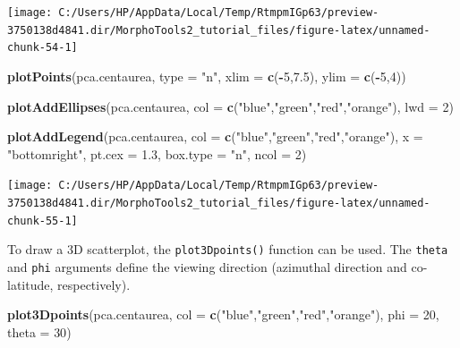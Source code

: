 \documentclass[
]{article}
\newenvironment{Shaded}{\begin{snugshade}}{\end{snugshade}}
\newcommand{\DataTypeTok}[1]{\textcolor[rgb]{0.13,0.29,0.53}{#1}}
\newcommand{\DecValTok}[1]{\textcolor[rgb]{0.00,0.00,0.81}{#1}}
\newcommand{\FloatTok}[1]{\textcolor[rgb]{0.00,0.00,0.81}{#1}}
\newcommand{\KeywordTok}[1]{\textcolor[rgb]{0.13,0.29,0.53}{\textbf{#1}}}
\newcommand{\NormalTok}[1]{#1}
\newcommand{\OperatorTok}[1]{\textcolor[rgb]{0.81,0.36,0.00}{\textbf{#1}}}
\newcommand{\StringTok}[1]{\textcolor[rgb]{0.31,0.60,0.02}{#1}}
\begin{document}
\begin{center}\texttt{[image: C:/Users/HP/AppData/Local/Temp/RtmpmIGp63/preview-3750138d4841.dir/MorphoTools2\_tutorial\_files/figure-latex/unnamed-chunk-54-1]} \end{center}

\begin{Shaded}
\begin{Highlighting}[]
\KeywordTok{plotPoints}\NormalTok{(pca.centaurea, }\DataTypeTok{type =} \StringTok{"n"}\NormalTok{, }\DataTypeTok{xlim =} \KeywordTok{c}\NormalTok{(}\OperatorTok{-}\DecValTok{5}\NormalTok{,}\FloatTok{7.5}\NormalTok{), }\DataTypeTok{ylim =} \KeywordTok{c}\NormalTok{(}\OperatorTok{-}\DecValTok{5}\NormalTok{,}\DecValTok{4}\NormalTok{))}

\KeywordTok{plotAddEllipses}\NormalTok{(pca.centaurea, }\DataTypeTok{col =} \KeywordTok{c}\NormalTok{(}\StringTok{"blue"}\NormalTok{,}\StringTok{"green"}\NormalTok{,}\StringTok{"red"}\NormalTok{,}\StringTok{"orange"}\NormalTok{), }\DataTypeTok{lwd =} \DecValTok{2}\NormalTok{)}

\KeywordTok{plotAddLegend}\NormalTok{(pca.centaurea, }\DataTypeTok{col =} \KeywordTok{c}\NormalTok{(}\StringTok{"blue"}\NormalTok{,}\StringTok{"green"}\NormalTok{,}\StringTok{"red"}\NormalTok{,}\StringTok{"orange"}\NormalTok{), }
              \DataTypeTok{x =} \StringTok{"bottomright"}\NormalTok{, }\DataTypeTok{pt.cex =} \FloatTok{1.3}\NormalTok{, }\DataTypeTok{box.type =} \StringTok{"n"}\NormalTok{, }\DataTypeTok{ncol =} \DecValTok{2}\NormalTok{)}
\end{Highlighting}
\end{Shaded}

\begin{center}\texttt{[image: C:/Users/HP/AppData/Local/Temp/RtmpmIGp63/preview-3750138d4841.dir/MorphoTools2\_tutorial\_files/figure-latex/unnamed-chunk-55-1]} \end{center}

To draw a 3D scatterplot, the \texttt{plot3Dpoints()} function can be
used. The \texttt{theta} and \texttt{phi} arguments define the viewing
direction (azimuthal direction and co-latitude, respectively).

\begin{Shaded}
\begin{Highlighting}[]
\KeywordTok{plot3Dpoints}\NormalTok{(pca.centaurea, }\DataTypeTok{col =} \KeywordTok{c}\NormalTok{(}\StringTok{"blue"}\NormalTok{,}\StringTok{"green"}\NormalTok{,}\StringTok{"red"}\NormalTok{,}\StringTok{"orange"}\NormalTok{), }\DataTypeTok{phi =} \DecValTok{20}\NormalTok{, }\DataTypeTok{theta =} \DecValTok{30}\NormalTok{)}
\end{Highlighting}
\end{Shaded}
\end{document}
